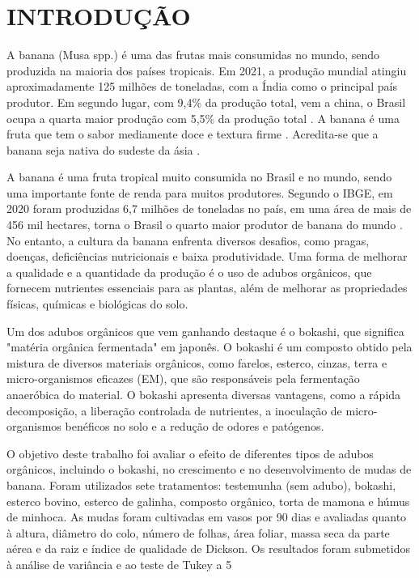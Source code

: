 \chapter{INTRODUÇÃO}

A banana (Musa spp.) é uma das frutas mais consumidas no mundo, sendo produzida na maioria dos países tropicais. Em 2021, a produção mundial atingiu aproximadamente 125 milhões de toneladas, com a Índia como o principal país produtor. Em segundo lugar, com 9,4\% da produção total, vem a china, o Brasil ocupa a quarta maior produção com 5,5\% da produção total \cite{banana}. A banana é uma fruta que tem o sabor mediamente doce e textura firme \cite{MATSUURA2004}. Acredita-se que a banana seja nativa do sudeste da ásia \cite{1956TaOo}.


A banana é uma fruta tropical muito consumida no Brasil e no mundo, sendo uma importante fonte de renda para muitos produtores. Segundo o IBGE, em 2020 foram produzidas 6,7 milhões de toneladas no país, em uma área de mais de 456 mil hectares, torna o Brasil o quarto maior produtor de banana do mundo \cite{banana}. No entanto, a cultura da banana enfrenta diversos desafios, como pragas, doenças, deficiências nutricionais e baixa produtividade. Uma forma de melhorar a qualidade e a quantidade da produção é o uso de adubos orgânicos, que fornecem nutrientes essenciais para as plantas, além de melhorar as propriedades físicas, químicas e biológicas do solo.

Um dos adubos orgânicos que vem ganhando destaque é o bokashi, que significa "matéria orgânica fermentada" em japonês. O bokashi é um composto obtido pela mistura de diversos materiais orgânicos, como farelos, esterco, cinzas, terra e micro-organismos eficazes (EM), que são responsáveis pela fermentação anaeróbica do material. O bokashi apresenta diversas vantagens, como a rápida decomposição, a liberação controlada de nutrientes, a inoculação de micro-organismos benéficos no solo e a redução de odores e patógenos.

O objetivo deste trabalho foi avaliar o efeito de diferentes tipos de adubos orgânicos, incluindo o bokashi, no crescimento e no desenvolvimento de mudas de banana. Foram utilizados sete tratamentos: testemunha (sem adubo), bokashi, esterco bovino, esterco de galinha, composto orgânico, torta de mamona e húmus de minhoca. As mudas foram cultivadas em vasos por 90 dias e avaliadas quanto à altura, diâmetro do colo, número de folhas, área foliar, massa seca da parte aérea e da raiz e índice de qualidade de Dickson. Os resultados foram submetidos à análise de variância e ao teste de Tukey a 5%

